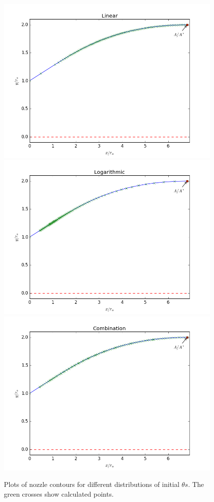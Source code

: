 \documentclass[10pt,a4paper]{article}
\begin{document}
\begin{figure}[!htb]
\centering
\includegraphics[scale=0.5]{linear_nozzle.png}
\\\includegraphics[scale=0.5]{logarithmic_nozzle.png}
\\\includegraphics[scale=0.5]{combo_nozzle.png}
\caption{Plots of nozzle contours for different distributions of initial $\theta s$. The green crosses show calculated points.}
\label{fig:contours}
\end{figure}
\end{document}
